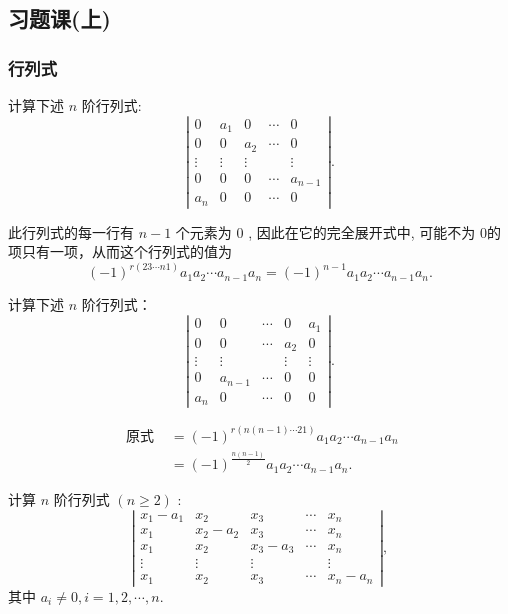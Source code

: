 \subsection{习题课(上)}

\subsubsection{行列式}

\begin{problem}
    计算下述 $n$ 阶行列式:
\[
\left|\begin{array}{ccccc}
0 & a_1 & 0 & \cdots & 0 \\
0 & 0 & a_2 & \cdots & 0 \\
\vdots & \vdots & \vdots & & \vdots \\
0 & 0 & 0 & \cdots & a_{n-1} \\
a_n & 0 & 0 & \cdots & 0
\end{array}\right| .
\]
\end{problem}

\begin{solution}
    此行列式的每一行有 $n-1$ 个元素为 0 , 因此在它的完全展开式中, 可能不为 0的项只有一项，从而这个行列式的值为
\[
(-1)^{r(23 \cdots n 1)} a_1 a_2 \cdots a_{n-1} a_n=(-1)^{n-1} a_1 a_2 \cdots a_{n-1} a_n .
\]
\end{solution}

\begin{problem}
    计算下述 $n$ 阶行列式：
\[
\left|\begin{array}{ccccc}
0 & 0 & \cdots & 0 & a_1 \\
0 & 0 & \cdots & a_2 & 0 \\
\vdots & \vdots & & \vdots & \vdots \\
0 & a_{n-1} & \cdots & 0 & 0 \\
a_n & 0 & \cdots & 0 & 0
\end{array}\right| .
\]
\end{problem}

\begin{solution}
    \[
\begin{aligned}
\text { 原式 } & =(-1)^{r(n(n-1) \cdots 21)} a_1 a_2 \cdots a_{n-1} a_n \\
& =(-1)^{\frac{n(n-1)}{2}} a_1 a_2 \cdots a_{n-1} a_n .
\end{aligned}
\]
\end{solution}

\begin{problem}
    计算 $n$ 阶行列式 $(n \geqslant 2)$ :
\[
\left|\begin{array}{ccccc}
x_1-a_1 & x_2 & x_3 & \cdots & x_n \\
x_1 & x_2-a_2 & x_3 & \cdots & x_n \\
x_1 & x_2 & x_3-a_3 & \cdots & x_n \\
\vdots & \vdots & \vdots & & \vdots \\
x_1 & x_2 & x_3 & \cdots & x_n-a_n
\end{array}\right|,
\]
其中 $a_i \neq 0, i=1,2, \cdots, n$.
\end{problem}

